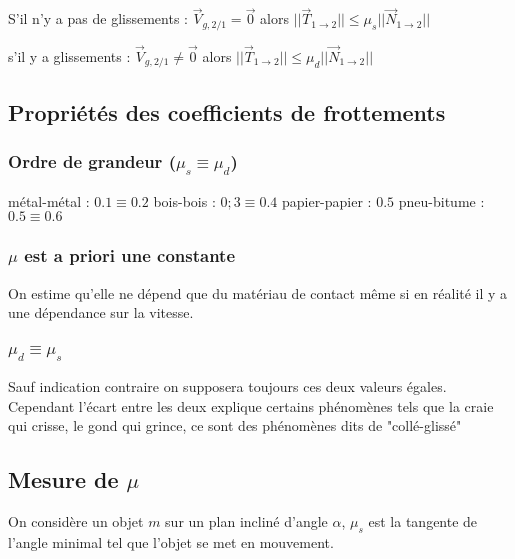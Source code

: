         \begin{enumerate}
            \itt S'il n'y a pas de glissements : \(\vec V_{g,2/1} = \vec 0\) alors \( || \vec T_{1\to 2} || \leq \mu_s || \vec N_{1\to 2} ||\)

            \itt s'il y a glissements : \(\vec V_{g,2/1} \neq \vec 0\) alors \( || \vec T_{1\to 2} || \leq \mu_d || \vec N_{1\to 2} ||\)
            
        \end{enumerate}

    \subsection{Propriétés des coefficients de frottements}

        \subsubsection{Ordre de grandeur (\(\mu_s \equiv \mu_d\))}

            \begin{enumerate}
                \itt métal-métal : \(0.1 \equiv 0.2\)
                \itt bois-bois : \(0;3 \equiv 0.4\)
                \itt papier-papier : \(0.5\)
                \itt pneu-bitume : \(0.5 \equiv 0.6\)
            \end{enumerate}

        \subsubsection{\(\mu\) est a priori une constante}
            On estime qu'elle ne dépend que du matériau de contact même si en réalité il y a une dépendance sur la vitesse.

        \subsubsection{\(\mu_d \equiv \mu_s\)}
            Sauf indication contraire on supposera toujours ces deux valeurs égales. Cependant l'écart entre les deux explique certains phénomènes tels que la craie qui crisse, le gond qui grince, ce sont des phénomènes dits de "collé-glissé"

        \subsection{Mesure de \(\mu\)}
            On considère un objet \(m\) sur un plan incliné d'angle \(\alpha\), \(\mu_s\) est la tangente de l'angle minimal tel que l'objet se met en mouvement.

